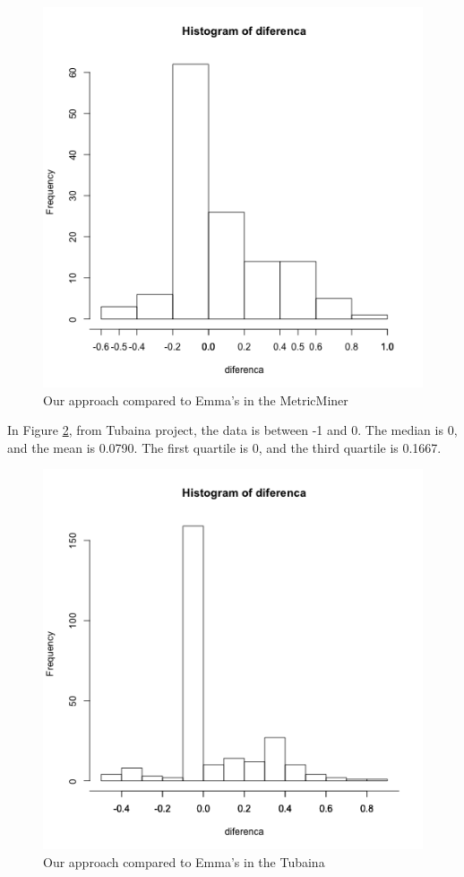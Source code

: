 \documentclass{sig-alternate}
\begin{document}
\begin{figure}[h!H]
  \centering
  \includegraphics[scale=0.5]{imgs/metricminer-histograma.png}
  \caption{Our approach compared to Emma's in the MetricMiner}
  \label{fig:metricminer}
\end{figure}

In Figure \ref{fig:tubaina}, from Tubaina project, the data is between
-1 and 0. The median is 0, and the mean is 0.0790. The first quartile is
0, and the third quartile is 0.1667.

\begin{figure}[h!H]
  \centering
  \includegraphics[scale=0.5]{imgs/tubaina-histograma.png}
  \caption{Our approach compared to Emma's in the Tubaina}
  \label{fig:tubaina}
\end{figure}
\end{document}
